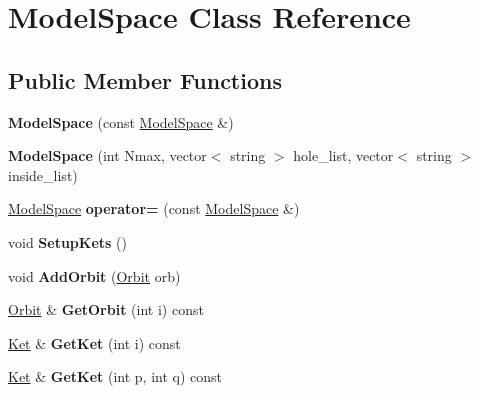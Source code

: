 \hypertarget{classModelSpace}{\section{Model\-Space Class Reference}
\label{classModelSpace}
}
\subsection*{Public Member Functions}
\begin{DoxyCompactItemize}
\item 
\hypertarget{classModelSpace_a9554b9bc74b82e392fafc9de496fce5f}{{\bfseries Model\-Space} (const \hyperlink{classModelSpace}{Model\-Space} \&)}\label{classModelSpace_a9554b9bc74b82e392fafc9de496fce5f}

\item 
\hypertarget{classModelSpace_a1d93cd1705e0f5dd3421e7617dbbc16e}{{\bfseries Model\-Space} (int Nmax, vector$<$ string $>$ hole\-\_\-list, vector$<$ string $>$ inside\-\_\-list)}\label{classModelSpace_a1d93cd1705e0f5dd3421e7617dbbc16e}

\item 
\hypertarget{classModelSpace_a2b01062b499979b919b7b77b04745cbe}{\hyperlink{classModelSpace}{Model\-Space} {\bfseries operator=} (const \hyperlink{classModelSpace}{Model\-Space} \&)}\label{classModelSpace_a2b01062b499979b919b7b77b04745cbe}

\item 
\hypertarget{classModelSpace_ae1a3578ed5aabec2956998a870a4e2d2}{void {\bfseries Setup\-Kets} ()}\label{classModelSpace_ae1a3578ed5aabec2956998a870a4e2d2}

\item 
\hypertarget{classModelSpace_ad8acc2ca5b475862101595d911987a7e}{void {\bfseries Add\-Orbit} (\hyperlink{classOrbit}{Orbit} orb)}\label{classModelSpace_ad8acc2ca5b475862101595d911987a7e}

\item 
\hypertarget{classModelSpace_afe51ff3553478b349eba65c61a19ca3e}{\hyperlink{classOrbit}{Orbit} \& {\bfseries Get\-Orbit} (int i) const }\label{classModelSpace_afe51ff3553478b349eba65c61a19ca3e}

\item 
\hypertarget{classModelSpace_adc36e64fb3bb4dc76819f91e9057844f}{\hyperlink{classKet}{Ket} \& {\bfseries Get\-Ket} (int i) const }\label{classModelSpace_adc36e64fb3bb4dc76819f91e9057844f}

\item 
\hypertarget{classModelSpace_ab3662f5e12ce6da0164c8adbe1abbb95}{\hyperlink{classKet}{Ket} \& {\bfseries Get\-Ket} (int p, int q) const }\label{classModelSpace_ab3662f5e12ce6da0164c8adbe1abbb95}


\end{DoxyCompactItemize}
